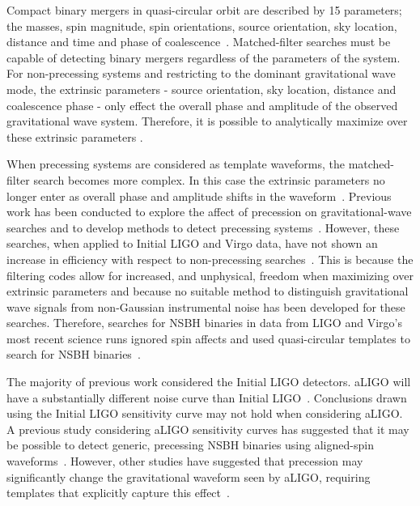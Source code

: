 Compact binary mergers in quasi-circular orbit are described by 15
parameters; the masses, spin magnitude, spin orientations, source orientation,
sky location, distance and time and phase of
coalescence~\cite{Peters:1963ux,Th300}. Matched-filter
searches must be capable of detecting binary mergers regardless of the
parameters of the system. For non-precessing systems and restricting to the
dominant gravitational wave mode, the extrinsic parameters - source orientation,
sky location, distance and coalescence phase - only effect the overall phase and
amplitude of the observed gravitational wave system. Therefore, it is possible
to analytically maximize over these extrinsic parameters \cite{Allen:2005fk}.

When precessing systems are considered as template waveforms, the matched-filter
search becomes more complex. In this case the extrinsic parameters no longer
enter as overall phase and amplitude shifts in the
waveform~\cite{Apostolatos:1994mx}. Previous work has been conducted to explore
the affect of precession on gravitational-wave searches and to develop methods
to detect precessing
systems~\cite{Apostolatos:1996rf,Buonanno:2002fy,Grandclement:2002dv,
Grandclement:2002vx,Grandclement:2003ck,Pan:2003qt,Buonanno:2004yd,
Buonanno:2005pt, Abbott:2007ai,VanDenBroeck:2009gd,Fazi:2009,Harry:2011qh,
Ajith:2012mn, Brown:2012gs,Lundgren:2013jla}. However, these searches, when
applied to Initial LIGO and Virgo data, have not shown an increase in efficiency
with respect to non-precessing searches~\cite{VanDenBroeck:2009gd}. This is
because the filtering codes allow for increased, and unphysical, freedom when
maximizing over extrinsic parameters and because no suitable method to
distinguish gravitational wave signals from non-Gaussian instrumental noise has
been developed for these searches. Therefore, searches for \ac{NSBH} binaries
in data from LIGO and Virgo's most recent science runs ignored spin affects and
used quasi-circular templates to search for \ac{NSBH}
binaries~\cite{Abbott:2009tt,Abbott:2009qj,Abadie:2010yba,Abadie:2011nz}.

The majority of previous work considered the Initial LIGO detectors. \ac{aLIGO}
will have a substantially different noise curve than Initial
LIGO~\cite{Aasi:2013wya}. Conclusions drawn using the Initial LIGO sensitivity
curve may not hold when considering \ac{aLIGO}. A previous study considering
\ac{aLIGO} sensitivity curves has suggested that it may be possible to detect
generic, precessing \ac{NSBH} binaries using aligned-spin 
waveforms~\cite{Ajith:2012mn}. However, other studies have suggested that
precession may significantly change the gravitational waveform seen by
\ac{aLIGO}, requiring templates that explicitly capture this
effect~\cite{Brown:2012gs}.

